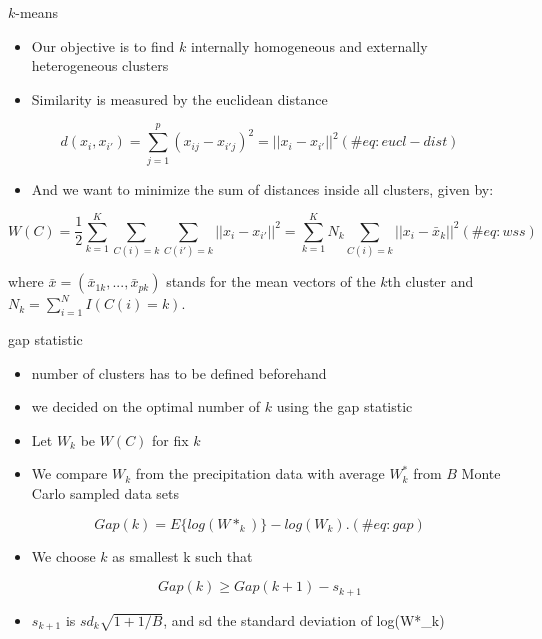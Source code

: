 \documentclass[
  ignorenonframetext,
]{beamer}
\providecommand{\tightlist}{%
  \setlength{\itemsep}{0pt}\setlength{\parskip}{0pt}}
\begin{document}
\begin{frame}{\(k\)-means}
\protect\hypertarget{k-means}{}
\begin{itemize}
\tightlist
\item
  Our objective is to find \(k\) internally homogeneous and externally
  heterogeneous clusters
\item
  Similarity is measured by the euclidean distance
\end{itemize}

\begin{equation} 
d(x_i,x_{i'}) = \sum_{j=1}^p(x_{ij}-x_{i'j})^2=||x_i-x_{i'}||^2
(\#eq:eucl-dist)
\end{equation}

\begin{itemize}
\tightlist
\item
  And we want to minimize the sum of distances inside all clusters,
  given by:
\end{itemize}

\begin{equation} 
W(C) = \frac{1}{2} \sum_{k=1}^{K} \sum_{C(i)=k} \sum_{C(i')=k} ||x_i-x_{i'}||^2 
= \sum_{k=1}^K N_k \sum_{C(i)=k} ||x_i-\bar{x}_k ||^2
(\#eq:wss)
\end{equation}

where \(\bar{x} = (\bar{x}_{1k},...,\bar{x}_{pk})\) stands for the mean
vectors of the \(k\)th cluster and \(N_k = \sum_{i=1}^N I(C(i)=k)\).
\end{frame}

\begin{frame}{gap statistic}
\protect\hypertarget{gap-statistic}{}
\begin{itemize}
\tightlist
\item
  number of clusters has to be defined beforehand
\item
  we decided on the optimal number of \(k\) using the gap statistic
\item
  Let \(W_k\) be \(W(C)\) for fix \(k\)
\item
  We compare \(W_k\) from the precipitation data with average \(W^*_k\)
  from \(B\) Monte Carlo sampled data sets
\end{itemize}

\begin{equation}
Gap(k) = E\{log(W*_k) \} - log(W_k).
(\#eq:gap)
\end{equation}

\begin{itemize}
\tightlist
\item
  We choose \(k\) as smallest k such that
\end{itemize}

\begin{equation}
Gap(k) \geq Gap(k+1) - s_{k+1}
\end{equation}

\begin{itemize}
\tightlist
\item
  \(s_{k+1}\) is \(sd_k\sqrt{1+1/B}\), and sd the standard deviation of
  log(W*\_k)
\end{itemize}
\end{frame}
\end{document}
